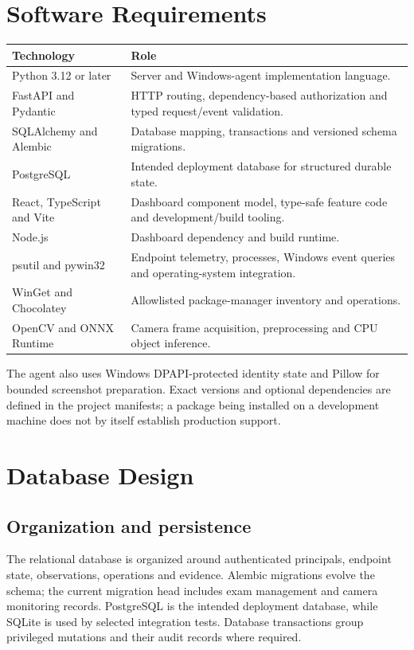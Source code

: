 \documentclass[12pt,a4paper]{report}
\begin{document}
\section{Software Requirements}
\begin{longtable}{p{}p{}}
\toprule
\textbf{Technology} & \textbf{Role}\\
\midrule
Python 3.12 or later & Server and Windows-agent implementation language.\\
FastAPI and Pydantic & HTTP routing, dependency-based authorization and
typed request/event validation.\\
SQLAlchemy and Alembic & Database mapping, transactions and versioned schema
migrations.\\
PostgreSQL & Intended deployment database for structured durable state.\\
React, TypeScript and Vite & Dashboard component model, type-safe feature
code and development/build tooling.\\
Node.js & Dashboard dependency and build runtime.\\
psutil and pywin32 & Endpoint telemetry, processes, Windows event queries
and operating-system integration.\\
WinGet and Chocolatey & Allowlisted package-manager inventory and operations.\\
OpenCV and ONNX Runtime & Camera frame acquisition, preprocessing and CPU
object inference.\\
\bottomrule
\end{longtable}
The agent also uses Windows DPAPI-protected identity state and Pillow for
bounded screenshot preparation. Exact versions and optional dependencies are
defined in the project manifests; a package being installed on a development
machine does not by itself establish production support.

\section{Database Design}

\subsection{Organization and persistence}
The relational database is organized around authenticated principals, endpoint
state, observations, operations and evidence. Alembic migrations evolve the
schema; the current migration head includes exam management and camera
monitoring records. PostgreSQL is the intended deployment database, while
SQLite is used by selected integration tests. Database transactions group
privileged mutations and their audit records where required.
\end{document}

